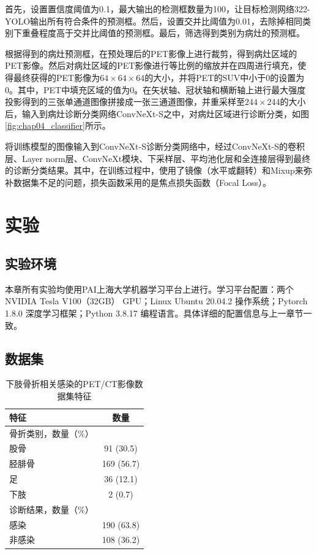 首先，设置置信度阈值为0.1，最大输出的检测框数量为100，让目标检测网络322-YOLO输出所有符合条件的预测框。然后，设置交并比阈值为0.01，去除掉相同类别下重叠程度高于交并比阈值的预测框。最后，筛选得到类别为病灶的预测框。

根据得到的病灶预测框，在预处理后的PET影像上进行裁剪，得到病灶区域的PET影像。然后对病灶区域的PET影像进行等比例的缩放并在四周进行填充，使得最终获得的PET影像为\(64\times64\times64\)的大小，并将PET的SUV中小于0的设置为0。其中，PET中填充区域的值为0。在矢状轴、冠状轴和横断轴上进行最大强度投影得到的三张单通道图像拼接成一张三通道图像，并重采样至\(244 \times 244\)的大小后，输入到病灶诊断分类网络ConvNeXt-S之中，对病灶区域进行诊断分类，如图\ref{fig:chap04_classifier}所示。

将训练模型的图像输入到ConvNeXt-S诊断分类网络中，经过ConvNeXt-S的卷积层、Layer norm层、ConvNeXt模块、下采样层、平均池化层和全连接层得到最终的诊断分类结果。其中，在训练过程中，使用了镜像（水平或翻转）和Mixup来弥补数据集不足的问题，损失函数采用的是焦点损失函数（Focal Loss）。

\section{实验}

\subsection{实验环境}

本章所有实验均使用PAI上海大学机器学习平台上进行。学习平台配置：两个NVIDIA Tesla V100（32GB） GPU；Linux Ubuntu 20.04.2 操作系统；Pytorch 1.8.0 深度学习框架；Python 3.8.17 编程语言。具体详细的配置信息与上一章节一致。

\subsection{数据集}

\begin{table}[htbp]
    \centering
    \caption{下肢骨折相关感染的PET/CT影像数据集特征}
    \begin{tabular}{lc}
        \toprule
        特征         & 数量       \\
        \midrule
        骨折类别，数量（\%）      \\
        \quad 股骨   & 91 (30.5)  \\
        \quad 胫腓骨 & 169 (56.7) \\
        \quad 足     & 36 (12.1)  \\
        \quad 下肢   & 2 (0.7)    \\
        诊断结果，数量（\%）      \\
        \quad 感染   & 190 (63.8) \\
        \quad 非感染 & 108 (36.2) \\
        \bottomrule
    \end{tabular}
    \label{tab:chap04_dataset}
\end{table}

